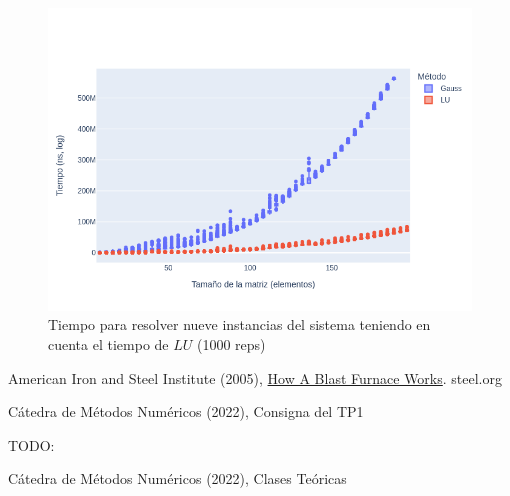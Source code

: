 \documentclass[12pt]{article}
\begin{document}
\begin{figure}[H]
\centering
\includegraphics[scale=0.5]{times.9.t_solve_lu}
\caption{Tiempo para resolver nueve instancias del sistema teniendo en cuenta el tiempo de \(LU\) (1000 reps)}
\label{fig:time.9solve}
\end{figure}

\listoffigures

\begin{thebibliography}{9}
American Iron and Steel Institute (2005), \href{https://web.archive.org/web/20070510164459/http://www.steel.org/AM/Template.cfm?Section=Home&template=%2FCM%2FHTMLDisplay.cfm&ContentID=5433}{How A Blast Furnace Works}. steel.org

Cátedra de Métodos Numéricos (2022), Consigna del TP1

TODO:

Cátedra de Métodos Numéricos (2022), Clases Teóricas

\end{thebibliography}
\end{document}
